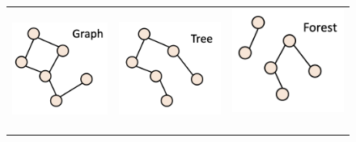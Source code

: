 \documentclass{article}
\begin{document}
\begin{description}
    \begin{figure}[H]
    	\centering
    	\begin{tabular}{lll}
    		\includegraphics[scale=0.5]{graph} & 
    		\includegraphics[scale=0.5]{tree}  &
    		\includegraphics[scale=0.5]{forest} \
    	\end{tabular}
    \end{figure}
    

\end{description}
\end{document}
